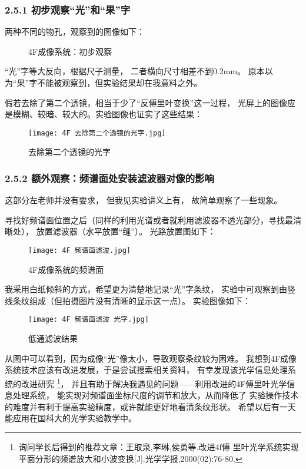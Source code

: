 \documentclass[11pt]{article}
\begin{document}
\subsubsection*{2.5.1 初步观察“光”和“果”字}

两种不同的物孔，观察到的图像如下：
\begin{figure}[H]
    \centering
    \hspace{0.5cm}
    \caption{4F成像系统：初步观察}
\end{figure}

“光”字等大反向，根据尺子测量，
二者横向尺寸相差不到0.2mm。
原本以为“果”字不能被观察到，但实验结果却在我意料之外。


假若去除了第二个透镜，相当于少了“反傅里叶变换”这一过程，
光屏上的图像应是模糊、较暗、较大的。实验图像也证实了这些结果：

\begin{figure}[H]
    \centering
    \texttt{[image: 4F 去除第二个透镜的光字.jpg]}
    \caption{去除第二个透镜的光字}
\end{figure}



\subsubsection*{2.5.2 额外观察：频谱面处安装滤波器对像的影响}

这部分左老师并没有要求，
但我见实验讲义上有，
故简单观察了一些现象。

寻找好频谱面位置之后（同样的利用光谱或者就利用滤波器不透光部分，寻找最清晰处），
放置滤波器（水平放置“缝”）。
光路放置图如下：

\begin{figure}[H]
    \centering
    \texttt{[image: 4F 频谱面滤波.jpg]}
    \caption{4F成像系统的频谱面}
\end{figure}

我采用白纸倾斜的方式，希望更为清楚地记录“光”字条纹，
实验中可观察到由竖线条纹组成（但拍摄图片没有清晰的显示这一点）。
实验图像如下：

\begin{figure}[H]
    \centering
    \texttt{[image: 4F 频谱面滤波 光字.jpg]}
    \caption{低通滤波结果}
\end{figure}

从图中可以看到，因为成像“光”像太小，导致观察条纹较为困难。
我想到4F成像系统技术应该有改进发展，于是尝试搜索相关资料，
有幸发现该光学信息处理系统的改进研究
\footnote[1]{询问学长后得到的推荐文章：王取泉,李琳,侯勇等.改进4f傅
里叶光学系统实现平面分形的频谱放大和小波变换[J].光学学报,2000(02):76-80.}，
并且有助于解决我遇见的问题——利用改进的4F傅里叶光学信息处理系统，
能实现对频谱面坐标尺度的调节和放大，从而降低了
实验操作技术的难度并有利于提高实验精度，或许就能更好地看清条纹形状。
希望以后有一天能应用在国科大的光学实验教学中。
\end{document}

